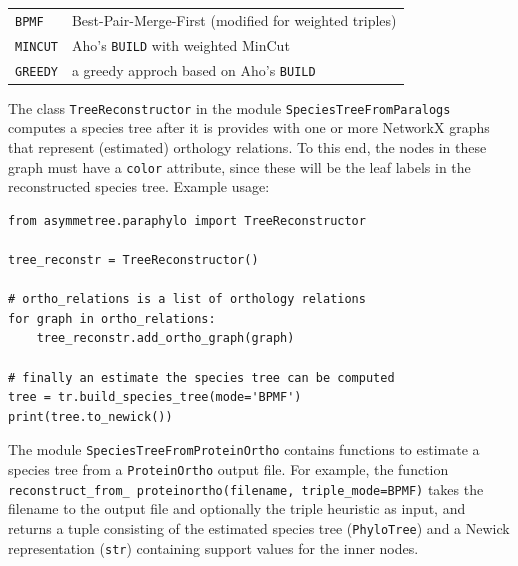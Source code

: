 \documentclass[hidelinks,11pt]{article}
\newcommand{\sq}{\textquotesingle}
\begin{document}
\vspace{3mm}
{\small\centering
\begin{longtable}{ p{2.5cm} p{9cm} }
	\texttt{BPMF} & Best-Pair-Merge-First \citep{wu2004} (modified for weighted triples)\\
	\texttt{MINCUT} & Aho's \texttt{BUILD} with weighted MinCut \citep{aho1981,byrka2010}\\
	\texttt{GREEDY} & a greedy approch based on Aho's \texttt{BUILD}\\
\end{longtable}
}
\vspace{3mm}

The class \texttt{TreeReconstructor} in the module \texttt{SpeciesTreeFromParalogs} computes a species tree after it is provides with one or more NetworkX graphs that represent (estimated) orthology relations.
To this end, the nodes in these graph must have a \texttt{\sq color\sq}
attribute, since these will be the leaf labels in the reconstructed species
tree.
Example usage:

\begin{adjustwidth}{1cm}{1cm}\vspace{2mm}
\begin{verbatim}
from asymmetree.paraphylo import TreeReconstructor

tree_reconstr = TreeReconstructor()

# ortho_relations is a list of orthology relations
for graph in ortho_relations:
    tree_reconstr.add_ortho_graph(graph)

# finally an estimate the species tree can be computed
tree = tr.build_species_tree(mode='BPMF')
print(tree.to_newick())
\end{verbatim}
\end{adjustwidth}

The module \texttt{SpeciesTreeFromProteinOrtho} contains functions to estimate
a species tree from a \texttt{ProteinOrtho} \citep{lechner2011} output file.
For example, the function \texttt{reconstruct\_from\_ proteinortho(filename,
triple\_mode=\sq BPMF\sq)} takes the filename to the output file and optionally
the triple heuristic as input, and returns a tuple consisting of the estimated
species tree (\texttt{PhyloTree}) and a Newick representation (\texttt{str})
containing support values for the inner nodes.




\newpage
\end{document}
